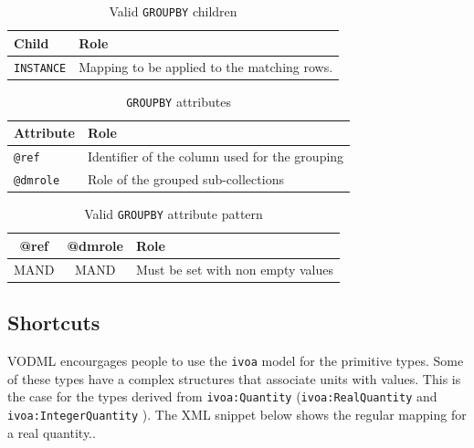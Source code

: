 \documentclass[11pt,a4paper]{ivoa}
\begin{document}
\begin{table}[hbtp]
\small
\centering
\begin{tabulary}{\linewidth}{|L|J|}
\hline
    \textbf{Child} &
    \textbf{Role} \\
\hline \hline
     \texttt{INSTANCE}    &
     Mapping to be applied to the matching rows.  \\       
\hline
\end{tabulary}
     \caption{Valid  \texttt{GROUPBY} children} 
     \label{tbl:group-children}
\end{table}

\begin{table}[!htbp]
\small
\centering
\begin{tabulary}{\linewidth}{|L|J|}
       \hline
           \textbf{Attribute} &  
           \textbf{Role} \\
       \hline  \hline
           \texttt{@ref}    & 
           Identifier of the column used for the grouping \\       
        \hline 
           \texttt{@dmrole}    & 
           Role of the grouped sub-collections\\       
        \hline 
\end{tabulary}
\caption{\texttt{GROUPBY} attributes} 
\label{tbl:group-att}
\end{table}

\begin{table}[!htbp]
\small
\centering
\begin{tabulary}{\linewidth}{|C|C|J|}
       \hline
           \textbf{@ref} & 
           \textbf{@dmrole} &  
           \textbf{Role} \\
        \hline   \hline
           MAND    &                       
           MAND    &            
           Must be set with non empty values \\       
       \hline 
\end{tabulary}
\caption{Valid \texttt{GROUPBY} attribute pattern} 
\label{tbl:group-patterns}
\end{table}


%
%
\clearpage
\subsection{Shortcuts}
VODML encourgages people to use the \texttt{ivoa} model for the primitive types. 
Some of these types have a complex structures that associate units with values. 
This is the case for the types derived from \texttt{ivoa:Quantity} (\texttt{ivoa:RealQuantity} and \texttt{ivoa:IntegerQuantity} ).
The XML snippet below shows the regular mapping for a real quantity..
\end{document}

